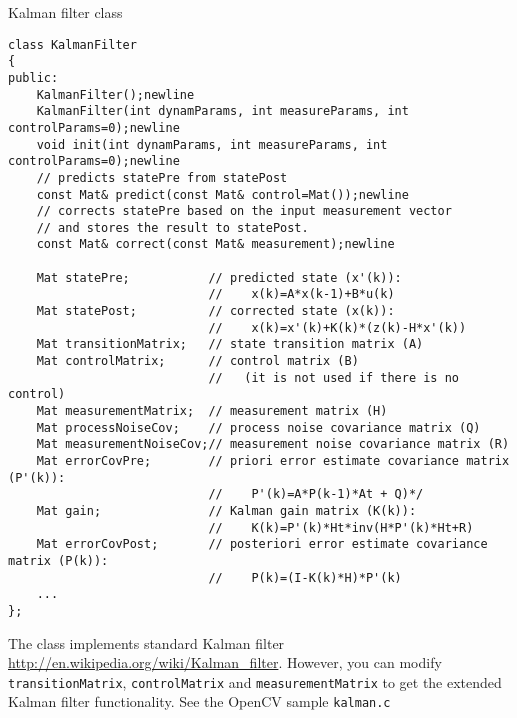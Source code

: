 Kalman filter class

\begin{lstlisting}
class KalmanFilter
{
public:
    KalmanFilter();newline
    KalmanFilter(int dynamParams, int measureParams, int controlParams=0);newline
    void init(int dynamParams, int measureParams, int controlParams=0);newline
    // predicts statePre from statePost
    const Mat& predict(const Mat& control=Mat());newline
    // corrects statePre based on the input measurement vector
    // and stores the result to statePost. 
    const Mat& correct(const Mat& measurement);newline

    Mat statePre;           // predicted state (x'(k)):
                            //    x(k)=A*x(k-1)+B*u(k)
    Mat statePost;          // corrected state (x(k)):
                            //    x(k)=x'(k)+K(k)*(z(k)-H*x'(k))
    Mat transitionMatrix;   // state transition matrix (A)
    Mat controlMatrix;      // control matrix (B)
                            //   (it is not used if there is no control)
    Mat measurementMatrix;  // measurement matrix (H)
    Mat processNoiseCov;    // process noise covariance matrix (Q)
    Mat measurementNoiseCov;// measurement noise covariance matrix (R)
    Mat errorCovPre;        // priori error estimate covariance matrix (P'(k)):
                            //    P'(k)=A*P(k-1)*At + Q)*/
    Mat gain;               // Kalman gain matrix (K(k)):
                            //    K(k)=P'(k)*Ht*inv(H*P'(k)*Ht+R)
    Mat errorCovPost;       // posteriori error estimate covariance matrix (P(k)):
                            //    P(k)=(I-K(k)*H)*P'(k)
    ...
};
\end{lstlisting}

The class implements standard Kalman filter \url{http://en.wikipedia.org/wiki/Kalman_filter}. However, you can modify \texttt{transitionMatrix}, \texttt{controlMatrix} and \texttt{measurementMatrix} to get the extended Kalman filter functionality. See the OpenCV sample \texttt{kalman.c}

\fi
